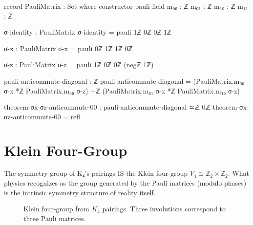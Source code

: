 \documentclass[11pt,a4paper]{book}
\begin{document}
\begin{code}
record PauliMatrix : Set where
  constructor pauli
  field
    m₀₀ : ℤ
    m₀₁ : ℤ
    m₁₀ : ℤ
    m₁₁ : ℤ

σ-identity : PauliMatrix
σ-identity = pauli 1ℤ 0ℤ 0ℤ 1ℤ

σ-x : PauliMatrix
σ-x = pauli 0ℤ 1ℤ 1ℤ 0ℤ

σ-z : PauliMatrix
σ-z = pauli 1ℤ 0ℤ 0ℤ (negℤ 1ℤ)

pauli-anticommute-diagonal : ℤ
pauli-anticommute-diagonal = 
  (PauliMatrix.m₀₀ σ-x *ℤ PauliMatrix.m₀₀ σ-z) +ℤ 
  (PauliMatrix.m₀₁ σ-x *ℤ PauliMatrix.m₁₀ σ-z)

theorem-σx-σz-anticommute-00 : pauli-anticommute-diagonal ≃ℤ 0ℤ
theorem-σx-σz-anticommute-00 = refl
\end{code}

\section{Klein Four-Group}

The symmetry group of K₄'s pairings IS the Klein four-group $V_4 \cong \mathbb{Z}_2 \times \mathbb{Z}_2$. What physics recognizes as the group generated by the Pauli matrices (modulo phases) is the intrinsic symmetry structure of reality itself.

\begin{figure}[h]
\centering
{}
\caption{Klein four-group from $K_4$ pairings. Three involutions correspond to three Pauli matrices.}
\label{fig:klein-four}
\end{figure}
\end{document}
